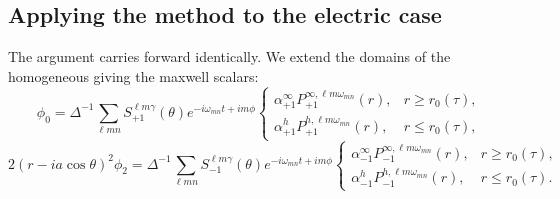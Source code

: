 \documentclass[preprint,showpacs,preprintnumbers,amssymb,superscriptaddress,aps,prd,nofootinbib,11pt]{revtex4-1}
\newcommand{\beq}{\begin{equation}}
\newcommand{\eeq}{\end{equation}}
\begin{document}
\subsection{Applying the method to the electric case}
The argument carries forward identically. We extend the domains of the homogeneous giving the maxwell scalars:
\beq
\phi_0 = \Delta^{-1} \sum_{\ell m n} S_{+1}^{\ell m \gamma}(\theta) e^{- i \omega_{mn} t + i m \phi}  
\begin{cases}
 \alpha_{+1}^{\infty} P_{+1}^{\infty , \ell m \omega_{mn}}(r) , & r \ge r_0(\tau) , \\
 \alpha_{+1}^{h} P_{+1}^{h , \ell m \omega_{mn}}(r) , & r \le r_0(\tau) , 
\end{cases}
\eeq
\beq
2 (r-i a \cos \theta)^2 \phi_2 = \Delta^{-1} \sum_{\ell m n} S_{-1}^{\ell m \gamma}(\theta) e^{- i \omega_{mn} t + i m \phi}  
\begin{cases}
 \alpha_{-1}^{\infty} P_{-1}^{\infty , \ell m \omega_{mn}}(r) , & r \ge r_0(\tau) , \\
 \alpha_{-1}^{h} P_{-1}^{h , \ell m \omega_{mn}}(r) , & r \le r_0(\tau). 
\end{cases}
\eeq
\end{document}
